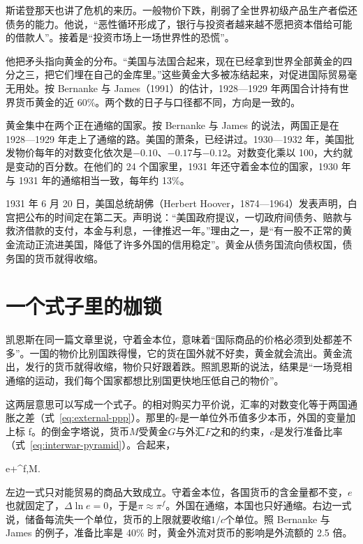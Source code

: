 斯诺登那天也讲了危机的来历。一般物价下跌，削弱了全世界初级产品生产者偿还债务的能力\cite{hansard1931}。他说，“恶性循环形成了，银行与投资者越来越不愿把资本借给可能的借款人”\cite{hansard1931}。接着是“投资市场上一场世界性的恐慌”\cite{hansard1931}。

他把矛头指向黄金的分布。“美国与法国合起来，现在已经拿到世界全部黄金的四分之三，把它们埋在自己的金库里。”\cite{hansard1931}这些黄金大多被冻结起来，对促进国际贸易毫无用处\cite{hansard1931}。按 Bernanke 与 James（1991）的估计，1928—1929 年两国合计持有世界货币黄金的近 60\%\cite{bernanke1991}。两个数的日子与口径都不同，方向是一致的。

黄金集中在两个正在通缩的国家。按 Bernanke 与 James 的说法，两国正是在 1928—1929 年走上了通缩的路\cite{bernanke1991}。美国的萧条，已经讲过。1930—1932 年，美国批发物价每年的对数变化依次是$-0.10$、$-0.17$与$-0.12$\cite{bernanke1991}。对数变化乘以 100，大约就是变动的百分数。在他们的 24 个国家里，1931 年还守着金本位的国家，1930 年与 1931 年的通缩相当一致，每年约 13\%\cite{bernanke1991}。

1931 年 6 月 20 日，美国总统胡佛（Herbert Hoover，1874—1964）发表声明，白宫把公布的时间定在第二天\cite{hoover1931,bnf28}。声明说：“美国政府提议，一切政府间债务、赔款与救济借款的支付，本金与利息，一律推迟一年。”\cite{hoover1931}理由之一，是“有一股不正常的黄金流动正流进美国，降低了许多外国的信用稳定”\cite{hoover1931}。黄金从债务国流向债权国，债务国的货币就得收缩。

\section{一个式子里的枷锁}\label{sec:depressionworld-fetters}

凯恩斯在同一篇文章里说，守着金本位，意味着“国际商品的价格必须到处都差不多”\cite{keynes1931}。一国的物价比别国跌得慢，它的货在国外就不好卖，黄金就会流出。黄金流出，发行的货币就得收缩，物价只好跟着跌。照凯恩斯的说法，结果是“一场竞相通缩的运动，我们每个国家都想比别国更快地压低自己的物价”\cite{keynes1931}。

这两层意思可以写成一个式子。的相对购买力平价说，汇率的对数变化等于两国通胀之差（式~\eqref{eq:external-ppp}）。那里的$e$是一单位外币值多少本币，外国的变量加上标 f。的倒金字塔说，货币$M$受黄金$G$与外汇$F$之和的约束，$c$是发行准备比率（式~\eqref{eq:interwar-pyramid}）。合起来，
\begin{keyeq}
\pi\approx\Delta\ln e+\pi^{f},\qquad M\le{}.\label{eq:depressionworld-fetters}
\end{keyeq}
左边一式只对能贸易的商品大致成立。守着金本位，各国货币的含金量都不变，$e$也就固定了，$\Delta\ln e=0$，于是$\pi\approx\pi^{f}$。外国在通缩，本国也只好通缩。右边一式说，储备每流失一个单位，货币的上限就要收缩$1/c$个单位。照 Bernanke 与 James 的例子，准备比率是 40\% 时，黄金外流对货币的影响是外流额的 2.5 倍\cite{bernanke1991}。

